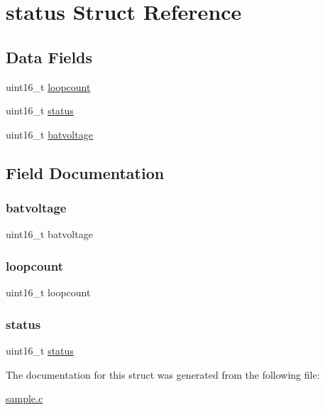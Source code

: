 \hypertarget{structstatus}{}\section{status Struct Reference}
\label{structstatus}
\subsection*{Data Fields}
\begin{DoxyCompactItemize}
\item 
uint16\+\_\+t \mbox{\hyperlink{structstatus_ad6771c066dbc9a3f9c97f67d183dafe4}{loopcount}}
\item 
uint16\+\_\+t \mbox{\hyperlink{structstatus_a5393c99e246925076b1dfd69a64177ef}{status}}
\item 
uint16\+\_\+t \mbox{\hyperlink{structstatus_a64bf6569e5dcde7c63303ca7557c4ce9}{batvoltage}}
\end{DoxyCompactItemize}


\subsection{Field Documentation}
\mbox{\label{structstatus_a64bf6569e5dcde7c63303ca7557c4ce9}} 
\subsubsection{\texorpdfstring{batvoltage}{batvoltage}}
{\footnotesize\ttfamily uint16\+\_\+t batvoltage}

\mbox{\label{structstatus_ad6771c066dbc9a3f9c97f67d183dafe4}} 
\subsubsection{\texorpdfstring{loopcount}{loopcount}}
{\footnotesize\ttfamily uint16\+\_\+t loopcount}

\mbox{\label{structstatus_a5393c99e246925076b1dfd69a64177ef}} 
\subsubsection{\texorpdfstring{status}{status}}
{\footnotesize\ttfamily uint16\+\_\+t \mbox{\hyperlink{structstatus}{status}}}



The documentation for this struct was generated from the following file\+:\begin{DoxyCompactItemize}
\item 
\mbox{\hyperlink{sample_8c}{sample.\+c}}\end{DoxyCompactItemize}
